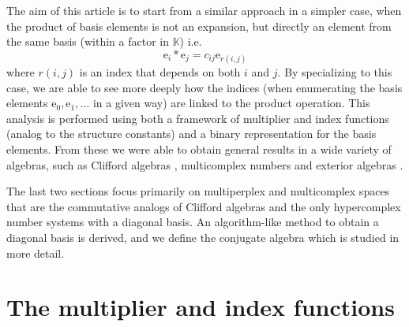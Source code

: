 \documentclass{article}
\begin{document}
The aim of this article is to start from a similar approach in a simpler case, when the product of basis elements is not an expansion, but directly an element from the same basis (within a factor in $\mathbb{K}$) i.e.
$$ \mathrm{e}_i*\mathrm{e}_j = c_{ij} \mathrm{e}_{r(i,j)} $$
where $r(i,j)$ is an index that depends on both $i$ and $j$. By specializing to this case, we are able to see more deeply how the indices (when enumerating the basis elements $\mathrm{e}_0, \mathrm{e}_1,\ldots$ in a given way) are linked to the product operation. This analysis is performed using both a framework of multiplier and index functions (analog to the structure constants) \cite{multiZ} and a binary representation for the basis elements. From these we were able to obtain general results in a wide variety of algebras, such as Clifford algebras \cite{baylis, Lounesto_2001}, multicomplex numbers \cite{GBPrice, BCHyper, StruppaVajiac2014} and exterior algebras \cite{oneill, bishopGoldberg}. 

The last two sections focus primarily on multiperplex and multicomplex spaces that are the commutative analogs of Clifford algebras \cite{SharmaCommutativeAnalogs} and the only hypercomplex number systems with a diagonal basis. An algorithm-like method to obtain a diagonal basis is derived, and we define the conjugate algebra which is studied in more detail.

\sloppy\section{The multiplier and index functions}
\label{section : multiplier and index vector spaces}
\end{document}
